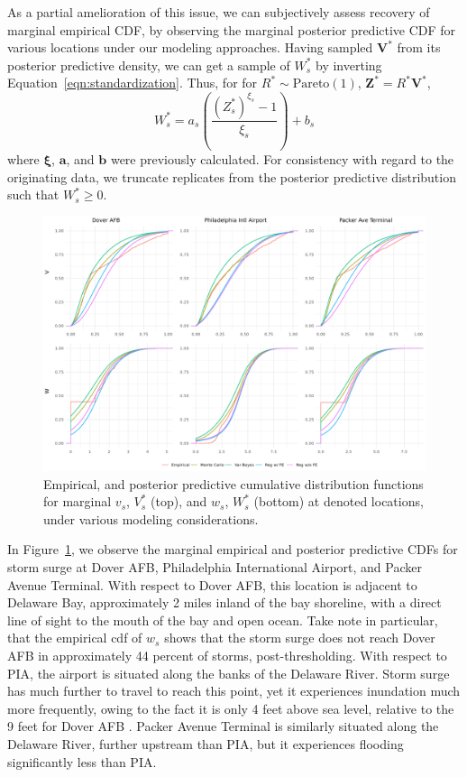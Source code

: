 As a partial amelioration of this issue, we can subjectively assess recovery of marginal 
    empirical CDF, by observing the marginal posterior predictive CDF for various locations
    under our modeling approaches. Having sampled $\bm{V}^{*}$ from its posterior predictive 
    density, we can get a sample of $W_s^*$ by inverting Equation~\eqref{eqn:standardization}.  
    Thus, for for $R^*\sim\text{Pareto}(1)$, $\bm{Z}^* = R^*\bm{V}^*$,
    \begin{equation}
        \label{eqn:invstandardization}
        W_s^* = a_s\left(\frac{(Z_s^*)^{\xi_s} - 1}{\xi_s}\right) + b_s
    \end{equation}
    where $\bm{\xi}$, $\bm{a}$, and $\bm{b}$ were previously calculated.  
    For consistency with regard to the originating data, we truncate replicates from the 
    posterior predictive distribution such that $W_{s}^* \geq 0$.
    
\begin{figure}[ht]
    \centering
    \includegraphics[width=0.95\linewidth]{./plots/delaware_marginal_cdfs.png}
    \caption{Empirical, and posterior predictive cumulative distribution functions for
        marginal $v_s$, $V_s^*$ (top), and $w_s$, $W_s^*$ (bottom) at denoted locations, under
        various modeling considerations.\label{fig:marginalcdfs}}
\end{figure}

In Figure~\ref{fig:marginalcdfs}, we observe the marginal empirical and posterior predictive
    CDFs for storm surge at Dover AFB, Philadelphia International Airport, and Packer Avenue 
    Terminal.  With respect to Dover AFB, this location is adjacent to Delaware Bay, 
    approximately 2 miles inland of the bay shoreline, with a direct line of sight to the 
    mouth of the bay and open ocean.  Take note in particular, that the empirical cdf of $w_s$ 
    shows that the storm surge does not reach Dover AFB in approximately \num{44} percent of 
    storms, post-thresholding.  With respect to PIA, the airport is situated along the banks 
    of the Delaware River.  Storm surge has much further to travel to reach this point, yet 
    it experiences inundation much more frequently, owing to the fact it is only 4 feet above 
    sea level, relative to the 9 feet for Dover AFB \makenote{[Confirm]}. Packer Avenue 
    Terminal is similarly situated along the Delaware River, further upstream than PIA, but 
    it experiences flooding significantly less than PIA.

